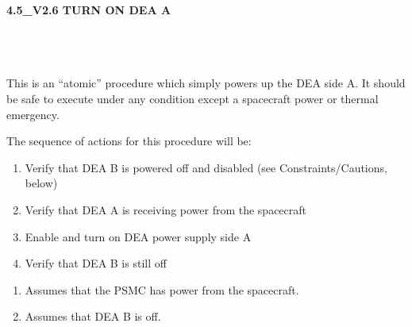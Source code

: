 \documentclass[11pt]{article}
\begin{document}
%
%
%
\newcommand{\be}{\begin{enumerate}}
\newcommand{\ee}{\end{enumerate}}
\newcommand{\bc}{\begin{center}}
\newcommand{\ec}{\end{center}}
\newcommand{\bi}{\begin{itemize}}
\newcommand{\ei}{\end{itemize}}
\newcommand{\bd}{\begin{description}}
\newcommand{\ed}{\end{description}}
\newcommand{\bt}{\begin{tabbing}}
\newcommand{\et}{\end{tabbing}}
\newcommand{\eg}{{\it e.g.~}}
\newcommand{\ie}{{\it i.e.~}}
\newcommand{\ul}{\underline}
\newcommand{\axaf}{{\em AXAF}}

\def\la{\hbox{\rlap{$<$}\lower0.5ex\hbox{$\sim$}\ }}


\large
\centerline {\bf 4.5\_V2.6 TURN ON DEA A}
\vspace{0.25in}

\normalsize
{}\\
 \\


 \\
\normalsize
This is an ``atomic'' procedure which simply powers up the DEA side A.
It should be safe to execute under any condition except a spacecraft 
power or thermal emergency.

\vspace{0.25in}
\noindent The sequence of actions for this procedure will be:
\be
\item Verify that DEA B is powered off and disabled (see Constraints/Cautions, below)
\vspace{-0.10in}
\item Verify that DEA A is receiving power from the spacecraft
\vspace{-0.10in}
\item Enable and turn on DEA power supply side A
\vspace{-0.10in}
\item Verify that DEA B is still off
\ee

\vspace{0.15in}
\normalsize
{}
\normalsize
\be
\item Assumes that the PSMC has power from the spacecraft.
\vspace{-0.10in}
\item Assumes that DEA B is off.
\ee
\vspace{0.1in}
\normalsize
{} \\
\normalsize
\end{document}

